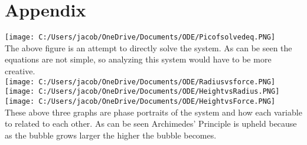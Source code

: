 \documentclass[11pt]{article}
\begin{document}
\section{Appendix} \hfill\break
\texttt{[image: C:/Users/jacob/OneDrive/Documents/ODE/Picofsolvedeq.PNG]} \\
\indent The above figure is an attempt to directly solve the system. As can be seen the equations are not simple, so analyzing this system would have to be more creative. \\
\texttt{[image: C:/Users/jacob/OneDrive/Documents/ODE/Radiusvsforce.PNG]} \\
\texttt{[image: C:/Users/jacob/OneDrive/Documents/ODE/HeightvsRadius.PNG]} \\
\texttt{[image: C:/Users/jacob/OneDrive/Documents/ODE/HeightvsForce.PNG]} \\
\indent These above three graphs are phase portraits of the system and how each variable to related to each other. As can be seen Archimedes' Principle is upheld because as the bubble grows larger the higher the bubble becomes.  
\end{document}
